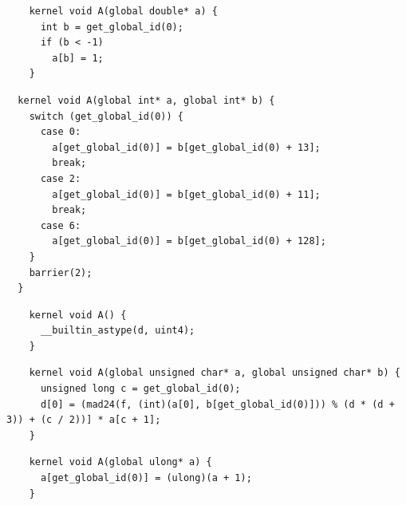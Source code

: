 
\newsavebox{\IntelSizetIntReduced}
\begin{lrbox}{\IntelSizetIntReduced}
  \hspace{1.5em}
  \begin{lstlisting}
    kernel void A(global double* a) {
      int b = get_global_id(0);
      if (b < -1)
        a[b] = 1;
    }
  \end{lstlisting}
\end{lrbox}

\newsavebox{\OclgrindRaceSwitch}
\begin{lrbox}{\OclgrindRaceSwitch}
  \hspace{1.5em}
  \begin{lstlisting}
  kernel void A(global int* a, global int* b) {
    switch (get_global_id(0)) {
      case 0:
        a[get_global_id(0)] = b[get_global_id(0) + 13];
        break;
      case 2:
        a[get_global_id(0)] = b[get_global_id(0) + 11];
        break;
      case 6:
        a[get_global_id(0)] = b[get_global_id(0) + 128];
    }
    barrier(2);
  }
  \end{lstlisting}
\end{lrbox}

\newsavebox{\AlmostEverythingCrash}
\begin{lrbox}{\AlmostEverythingCrash}
  \hspace{1.5em}
  \begin{lstlisting}
    kernel void A() {
      __builtin_astype(d, uint4);
    }
  \end{lstlisting}
\end{lrbox}

\newsavebox{\OclgrindSemaAssertion}
\begin{lrbox}{\OclgrindSemaAssertion}
  \hspace{1.5em}
  \begin{lstlisting}
    kernel void A(global unsigned char* a, global unsigned char* b) {
      unsigned long c = get_global_id(0);
      d[0] = (mad24(f, (int)(a[0], b[get_global_id(0)])) % (d * (d + 3)) + (c / 2))] * a[c + 1];
    }
  \end{lstlisting}
\end{lrbox}

\newsavebox{\IntelPtrCompilerHang}
\begin{lrbox}{\IntelPtrCompilerHang}
  \hspace{1.5em}
  \begin{lstlisting}
    kernel void A(global ulong* a) {
      a[get_global_id(0)] = (ulong)(a + 1);
    }
  \end{lstlisting}
\end{lrbox}

